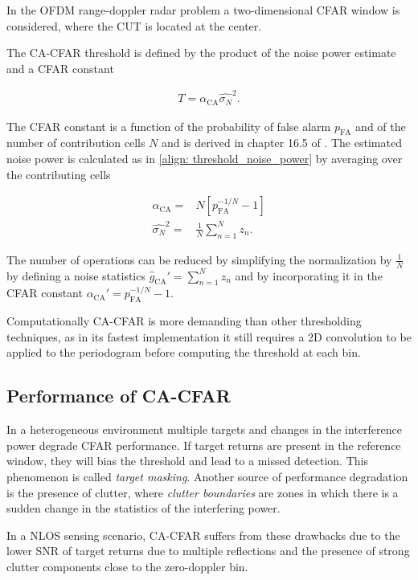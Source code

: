 In the OFDM range-doppler radar problem a two-dimensional CFAR window is considered, where the CUT is located at the center.


The CA-CFAR threshold is defined by the product of the noise power estimate and a CFAR constant

\begin{align}
	T = \alpha_{\text{CA}} \hat{\sigma_N}^2.
\end{align}

The CFAR constant is a function of the probability of false alarm $p_{\text{FA}}$ and of the number of contribution cells $N$ and is derived in chapter 16.5 of \cite{Richards_Scheer_Holm_2010}. The estimated noise power is calculated as in \ref{align: threshold_noise_power} by averaging over the contributing cells

\begin{align}
	\alpha_{\text{CA}} =& N[p_{\text{FA}}^{-1/N} - 1] \\
	\hat{\sigma_N}^2 =& \frac{1}{N}\sum_{n=1}^N z_n.
\end{align}

The number of operations can be reduced by simplifying the normalization by $\frac{1}{N}$ by defining a noise statistics $\hat{g}_{\text{CA}}' = \sum_{n=1}^N z_n$ and by incorporating it in the CFAR constant $\alpha_{\text{CA}}' = p_{\text{FA}}^{-1/N} - 1$.

Computationally CA-CFAR is more demanding than other thresholding techniques, as in its fastest implementation it still requires a 2D convolution to be applied to the periodogram before computing the threshold at each bin.

\subsection{Performance of CA-CFAR}

In a heterogeneous environment multiple targets and changes in the interference power degrade CFAR performance. If target returns are present in the reference window, they will bias the threshold and lead to a missed detection. This phenomenon is called \textit{target masking}. Another source of performance degradation is the presence of clutter, where \textit{clutter boundaries} are zones in which there is a sudden change in the statistics of the interfering power.

In a NLOS sensing scenario, CA-CFAR suffers from these drawbacks due to the lower SNR of target returns due to multiple reflections and the presence of strong clutter components close to the zero-doppler bin.

